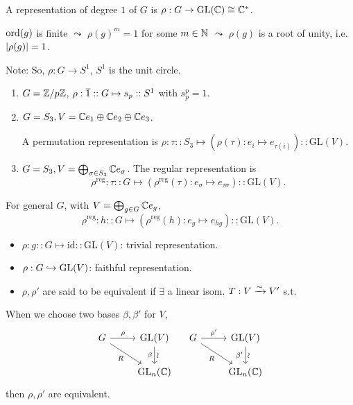 \begin{example}
  A representation of degree $1$ of $G$ is $\rho: G \to \text{GL}(\mathbb{C})
  \cong \mathbb{C}^*$.

  $\operatorname{ord}(g)$ is finite $\leadsto$ $\rho(g)^m = 1$ for some $m \in \mathbb{N}$
  $\leadsto$ $\rho(g)$ is a root of unity, i.e. $\lvert\rho(g)\rvert = 1$.

  Note: So, $\rho: G \to S^1$, $S^1$ is the unit circle.

  \begin{enumerate}
    \item $G = {\mathbb{Z}}/{p\mathbb{Z}}$,
      $\rho: \overline{1} :: G \mapsto s_p :: S^1$ with $s_p^p = 1$.
    \item $G = S_3, V = \mathbb{C} e_1 \oplus \mathbb{C} e_2 \oplus \mathbb{C} e_3$.

      A permutation representation is
      $\rho: \tau :: S_3 \mapsto (\rho(\tau): e_i \mapsto e_{\tau(i)})
      :: \text{GL}(V)$.
      
    \item $G = S_3, V = \bigoplus_{\sigma \in S_3} \mathbb{C} e_{\sigma}$.
      The regular representation is
      \[ \rho^{\text{reg}}: \tau :: G \mapsto
      (\rho^{\text{reg}}(\tau): e_{\sigma} \mapsto e_{\tau \sigma})
      :: \text{GL}(V). \]
  \end{enumerate}
\end{example}

For general $G$, with $V = \bigoplus_{g\in G} \mathbb{C} e_g$,
\[ \rho^{\text{reg}}: h :: G \mapsto
  (\rho^{\text{reg}}(h): e_{g} \mapsto e_{hg})
:: \text{GL}(V). \]

\begin{definition} \mbox{}
  \begin{itemize}
    \item $\rho: g :: G \mapsto \text{id} :: \text{GL}(V)$:
      trivial representation.
    \item $\rho: G \hookrightarrow \text{GL}(V)$: faithful representation.
    \item $\rho, \rho'$ are said to be equivalent if $\exists$ a linear isom.
      $T: V \xrightarrow{\sim} V'$ s.t.
        
  \end{itemize}
\end{definition}

\begin{remark}
  When we choose two bases $\beta, \beta'$ for $V$,
  \[
    \begin{tikzcd}
      G \arrow{r}{\rho} \arrow[swap]{dr}{R} & \text{GL}(V) \arrow[d, "\beta"', "\rotatebox{90}{\(\sim\)}"] \\
                                            & \text{GL}_n(\Cb)
    \end{tikzcd} \quad
    \begin{tikzcd}
      G \arrow{r}{\rho'} \arrow[swap]{dr}{R} & \text{GL}(V) \arrow[d, "\beta'"', "\rotatebox{90}{\(\sim\)}"] \\
                                            & \text{GL}_n(\Cb)
    \end{tikzcd}
  \]
  then $\rho, \rho'$ are equivalent.
\end{remark}

